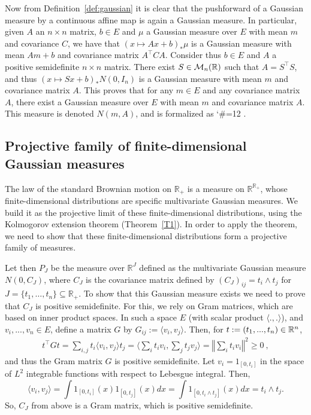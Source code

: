 \documentclass[lean]{Draft}
\makeatletter
\newcommand\leanlink{\begingroup\catcode`\#=12\relax\@leanlink}
\newcommand\@leanlink[2]{\endgroup
\href{#1}
{\texttt{\detokenize{#2}}}}
\newcommand{\docs}[1]{%
\leanlink{https://remydegenne.github.io/brownian-motion/docs/find/?pattern=#1\#doc}
{#1}}
\makeatother
\begin{document}
Now from Definition~\ref{def:gaussian} it is clear that the pushforward of a Gaussian measure by a continuous affine map is again a Gaussian measure. In particular, given $A$ an $n \times n$ matrix, $b \in E$ and $\mu$ a Gaussian measure over $E$ with mean $m$ and covariance $C$, we have that $(x \mapsto Ax + b)_* \mu$ is a Gaussian measure with mean $Am + b$ and covariance matrix $A^\top C A$.
Consider thus $b \in E$ and $A$ a positive semidefinite $n \times n$ matrix.
There exist $S \in \mathcal{M}_n(\mathbb{R})$ such that $A = S^\top S$, and thus $(x \mapsto Sx + b)_* N(0, I_n)$ is a Gaussian measure with mean $m$ and covariance matrix $A$. This proves that for any $m \in E$ and any covariance matrix $A$, there exist a Gaussian measure over $E$ with mean $m$ and covariance matrix $A$. This measure is denoted $N(m, A)$, and is formalized as \docs{ProbabilityTheory.multivariateGaussian}.



\subsection{Projective family of finite-dimensional Gaussian measures}

The law of the standard Brownian motion on $\mathbb{R}_+$ is a measure on $\mathbb{R}^{\mathbb{R}_+}$, whose finite-dimensional distributions are specific multivariate Gaussian measures.
We build it as the projective limit of these finite-dimensional distributions, using the Kolmogorov extension theorem (Theorem~\ref{T1}).
In order to apply the theorem, we need to show that these finite-dimensional distributions form a projective family of measures.

Let then $P_J$ be the measure over $\mathbb{R}^J$ defined as the multivariate Gaussian measure $N(0, C_J)$, where $C_J$ is the covariance matrix defined by $(C_J)_{ij} = t_i \wedge t_j$ for $J = \{t_1, \dots, t_n\} \subseteq \mathbb{R}_+$.
To show that this Gaussian measure exists we need to prove that $C_J$ is positive semidefinite.
For this, we rely on Gram matrices, which are based on inner product spaces. In such a space $E$ (with scalar product $\langle .,. \rangle$), and $v_i,...,v_n \in E$, define a matrix $G$ by $G_{ij} := \langle v_i, v_j\rangle$.
Then, for $t :=(t_1,...,t_n) \in \mathbb{R}^n$,
\begin{align*}
  t^\top G t = \sum_{i,j} t_i \langle v_i, v_j\rangle t_j = \Big\langle \sum_i t_i v_i, \sum_j t_j v_j\Big\rangle = \left\Vert \sum_i t_i v_i \right\Vert^2 \geq 0
  \: ,
\end{align*}
and thus the Gram matrix $G$ is positive semidefinite.
Let $v_i = 1_{[0,t_i]}$ in the space of $L^2$ integrable functions with respect to Lebesgue integral. Then,
$$ \langle v_i, v_j \rangle = \int 1_{[0,t_i]}(x) 1_{[0,t_j]}(x) dx = \int 1_{[0,t_i \wedge t_j]}(x) dx = t_i \wedge t_j.$$
So, $C_J$ from above is a Gram matrix, which is positive semidefinite.
\end{document}
